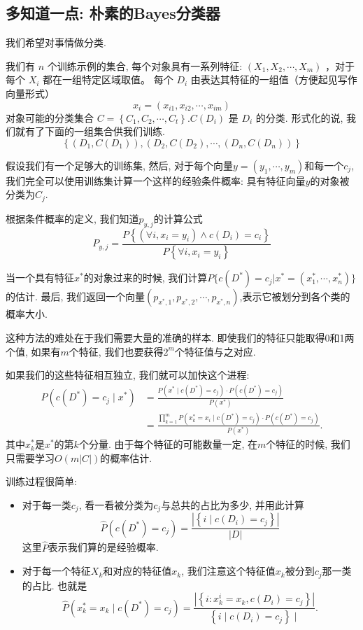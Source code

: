 \subsection{多知道一点: 朴素的Bayes分类器}
我们希望对事情做分类. 

我们有 $n$ 个训练示例的集合, 每个对象具有一系列特征: $\left(X_1, X_2, \cdots, X_m\right)$ ，对于每个 $X_i$ 都在一组特定区域取值。
每个 $D_i$ 由表达其特征的一组值（方便起见写作向量形式）
$$
x_i=\left(x_{i 1}, x_{i 2}, \cdots, x_{i m}\right)
$$
对象可能的分类集合 $C=\left\{C_1, C_2, \cdots, C_t\right\} . C\left(D_i\right)$ 是 $D_i$ 的分类. 
形式化的说, 我们就有了下面的一组集合供我们训练. 
$$\left\{\left(D_1, C\left(D_1\right)\right),\left(D_2, C\left(D_2\right), \cdots,\left(D_n, C\left(D_n\right)\right)\right\}\right.$$

假设我们有一个足够大的训练集, 然后, 对于每个向量\( y=\left(y_1, \cdots, y_m\right) \)和每一个$c_j$, 我们完全可以使用训练集计算一个这样的经验条件概率: 具有特征向量$y$的对象被分类为$C_j$.

根据条件概率的定义, 我们知道$p_{y,j}$的计算公式
$$
P_{y, j}=\frac{P\left\{\left(\forall i, x_i=y_i\right) \wedge c\left(D_i\right)=c_i\right\}}{P\left\{\forall i, x_i=y_i\right\}}
$$

当一个具有特征$x^*$的对象过来的时候, 我们计算$P\{c(D^*)=c_j | x^* =(x_1^*,\cdots, x_n^*)\}$的估计. 最后, 我们返回一个向量$(p_{x^*, 1},p_{x^*, 2},\cdots, p_{x^*, n})$,表示它被划分到各个类的概率大小.

这种方法的难处在于我们需要大量的准确的样本. 即使我们的特征只能取得0和1两个值, 如果有$m$个特征, 我们也要获得$2^m$个特征值与之对应. 

如果我们的这些特征相互独立, 我们就可以加快这个进程: 
$$
\begin{aligned}
P\left(c\left(D^*\right)=c_j \mid x^*\right) & =\frac{P\left(x^* \mid c\left(D^*\right)=c_j\right) \cdot P\left(c\left(D^*\right)=c_j\right)}{P\left(x^*\right)} \\
& =\frac{\prod_{k=1}^m P\left(x_k^*=x_i \mid c\left(D^*\right)=c_j\right) \cdot P\left(c\left(D^*\right)=c_j\right)}{P\left(x^*\right)} .
\end{aligned}
$$
其中$x_k^*$是$x^*$的第$k$个分量. 由于每个特征的可能数量一定, 在$m$个特征的时候, 我们只需要学习$O(m|C|)$的概率估计. 

训练过程很简单: 
\begin{itemize}
    \item 对于每一类$c_j$, 看一看被分类为$c_j$与总共的占比为多少, 并用此计算$$
    \hat{P}\left(c\left(D^*\right)=c_j\right)=\frac{\left|\left\{i \mid c\left(D_i\right)=c_j\right\}\right|}{|D|}
    $$这里$\hat P$表示我们算的是经验概率.
    \item 对于每一个特征$X_k$和对应的特征值$x_k$, 我们注意这个特征值$x_k$被分到$c_j$那一类的占比. 也就是$$
    \hat{P}\left(x_k^*=x_k \mid c\left(D^*\right)=c_j\right)=\frac{\left|\left\{i: x_k^i=x_k, c\left(D_i\right)=c_j\right\}\right|}{\left\{i \mid c\left(D_i\right)=c_j\right\} \mid} .
    $$
\end{itemize}


